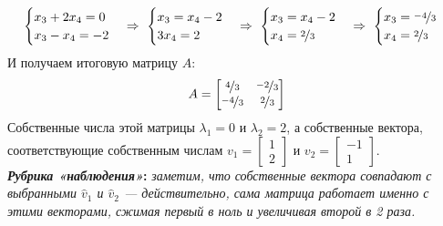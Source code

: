 \documentclass[a3paper,14pt]{extarticle}
\newcommand{\observ}[1]{\textbf{\textit{Рубрика «наблюдения»}:} \textit{#1}}
\begin{document}
$$\begin{cases}
    x_3 + 2x_4 = 0 \\ x_3 - x_4 = -2
\end{cases} \Rightarrow\ \begin{cases}
    x_3 = x_4 -2 \\ 3x_4 = 2
\end{cases} \Rightarrow\ \begin{cases}
    x_3 = x_4 - 2 \\ x_4 = \nicefrac{2}{3}
\end{cases} \Rightarrow\ \begin{cases}
    x_3 = \nicefrac{-4}{3} \\ x_4 = \nicefrac{2}{3}
\end{cases}$$
И получаем итоговую матрицу $A$:
$$A = \begin{bmatrix}
    \nicefrac{4}{3} & \nicefrac{-2}{3} \\ \nicefrac{-4}{3} & \nicefrac{2}{3}
\end{bmatrix}$$
Собственные числа этой матрицы $\lambda_1 = 0$ и $\lambda_2 = 2$, а собственные вектора, соответствующие собственным числам $v_1 = \left[\begin{smallmatrix}
    1 \\ 2
\end{smallmatrix}\right]$ и $v_2 = \left[\begin{smallmatrix}
    -1 \\ 1
\end{smallmatrix}\right]$. \\[0.5em]
\observ{заметим, что собственные вектора совпадают с выбранными $\hat{v}_1$ и $\hat{v}_2$ --- действительно, сама матрица работает именно с этими векторами, сжимая первый в ноль и увеличивая второй в 2 раза.}\pagebreak
\end{document}
